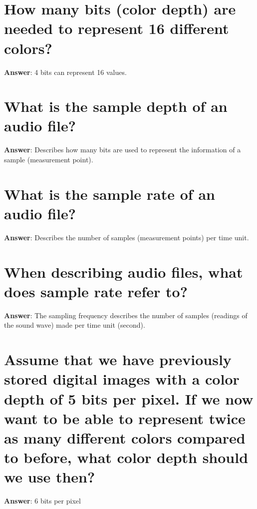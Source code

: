 \documentclass[a4paper,11pt,oneside]{book}
\begin{document}
\begin{sloppypar}
\section{How many bits (color depth) are needed to represent 16 different colors?}

\label{q:80:sa:en:True}

\textbf{Answer}: 4 bits can represent 16 values.



\section{What is the sample depth of an audio file?}

\label{q:81:sa:en:True}

\textbf{Answer}: Describes how many bits are used to represent the information of a sample (measurement point).



\section{What is the sample rate of an audio file?}

\label{q:82:sa:en:True}

\textbf{Answer}: Describes the number of samples (measurement points) per time unit.



\section{When describing audio files, what does sample rate refer to?}

\label{q:83:sa:en:True}

\textbf{Answer}: The sampling frequency describes the number of samples (readings of the sound wave) made per time unit (second).



\section{Assume that we have previously stored digital images with a color depth of 5 bits per pixel. If we now want to be able to represent twice as many different colors compared to before, what color depth should we use then?}

\label{q:84:sa:en:True}

\textbf{Answer}: 6 bits per pixel




\end{sloppypar}
\end{document}
